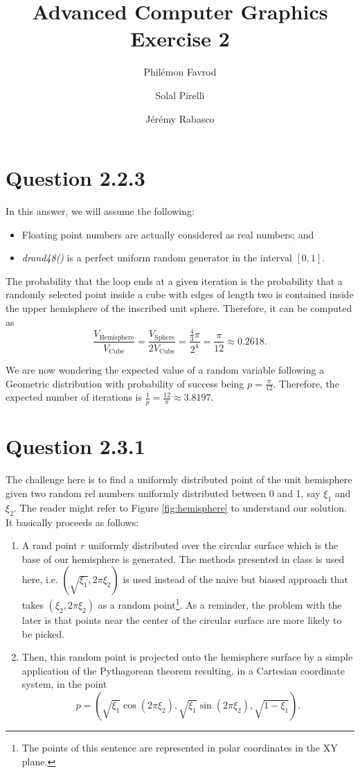 \documentclass{article}
\title{Advanced Computer Graphics\\Exercise 2}
\author{Phil\'emon Favrod \and Solal Pirelli \and J\'er\'emy Rabasco}
\begin{document}
\maketitle

\section*{Question 2.2.3}
In this answer, we will assume the following:
\begin{itemize}
\item Floating point numbers are actually considered as real numbers; and
\item \textit{drand48()} is a perfect uniform random generator in the interval $[0, 1]$.
\end{itemize}
The probability that the loop ends at a given iteration is the probability that a randomly selected point inside a cube with edges of length two is contained inside the upper hemisphere of the inscribed unit sphere. Therefore, it can be computed as
$$
\frac{V_{\text{Hemisphere}}}{V_{\text{Cube}}} = \frac{V_{\text{Sphere}}}{2V_{\text{Cube}}} = \frac{\frac{4}{3}\pi}{2^4} = \frac{\pi}{12} \approx 0.2618. 
$$

We are now wondering the expected value of a random variable following a Geometric distribution with probability of success being $p = \frac{\pi}{12}$. Therefore,
the expected number of iterations is $\frac 1p = \frac{12}{\pi} \approx 3.8197$.

\section*{Question 2.3.1}
The challenge here is to find a uniformly distributed point of the unit hemisphere given two random rel numbers uniformly distributed between 0 and 1, say $\xi_1$ and $\xi_2$. The reader might refer to Figure \ref{fig:hemisphere} to understand our solution. It basically proceeds as follows:
\begin{enumerate}[1.]
\item A rand point $r$ uniformly distributed over the circular surface which is the base of our hemisphere is generated. The methods presented in class is used here, i.e. $(\sqrt{\xi_1}, 2\pi\xi_2)$ is used instead of the naive but biased approach that takes $(\xi_2, 2\pi\xi_2)$ as a random point\footnote{The points of this sentence are represented in polar coordinates in the XY plane.}. As a reminder, the problem with the later is that points near the center of the circular surface are more likely to be picked. 
\item Then, this random point is projected onto the hemisphere surface by a simple application of the Pythagorean theorem resulting, in a Cartesian coordinate system, in the point
$$
p = (\sqrt{\xi_1}\cos{\left( 2\pi\xi_2\right)}, \sqrt{\xi_1}\sin{\left( 2\pi\xi_2\right)}, \sqrt{1 - \xi_1}).
$$
\end{enumerate}
\end{document}
